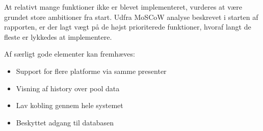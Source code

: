 At relativt mange funktioner ikke er blevet implementeret, vurderes at være grundet store ambitioner fra start. Udfra MoSCoW analyse beskrevet i starten af rapporten, er der lagt vægt på de højst prioriterede funktioner, hvoraf langt de fleste er lykkedes at implementere.

Af særligt gode elementer kan fremhæves:
\begin{itemize}
	\item Support for flere platforme via samme presenter
	\item Visning af history over pool data
	\item Lav kobling gennem hele systemet
	\item Beskyttet adgang til databasen
\end{itemize}